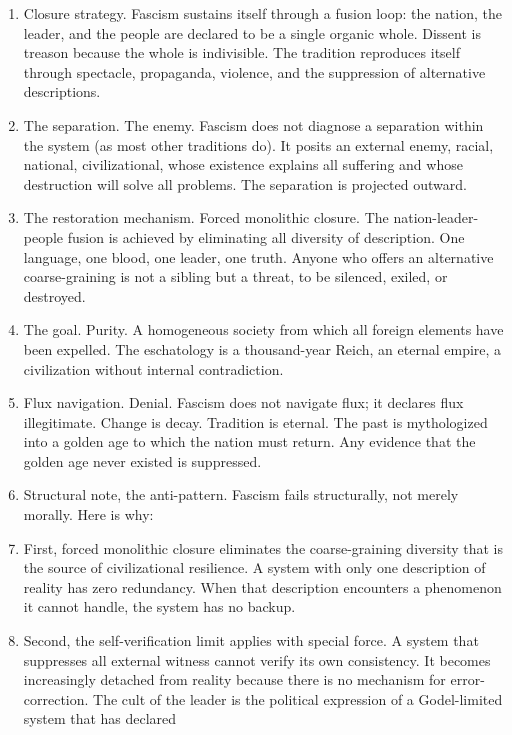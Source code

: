 \documentclass[
]{article}
\begin{document}
\begin{enumerate}
\def\labelenumi{\arabic{enumi}.}
\setcounter{enumi}{94}
\item
  Closure strategy. Fascism sustains itself through a fusion loop: the
  nation, the leader, and the people are declared to be a single organic
  whole. Dissent is treason because the whole is indivisible. The
  tradition reproduces itself through spectacle, propaganda, violence,
  and the suppression of alternative descriptions.
\item
  The separation. The enemy. Fascism does not diagnose a separation
  within the system (as most other traditions do). It posits an external
  enemy, racial, national, civilizational, whose existence explains all
  suffering and whose destruction will solve all problems. The
  separation is projected outward.
\item
  The restoration mechanism. Forced monolithic closure. The
  nation-leader-people fusion is achieved by eliminating all diversity
  of description. One language, one blood, one leader, one truth. Anyone
  who offers an alternative coarse-graining is not a sibling but a
  threat, to be silenced, exiled, or destroyed.
\item
  The goal. Purity. A homogeneous society from which all foreign
  elements have been expelled. The eschatology is a thousand-year Reich,
  an eternal empire, a civilization without internal contradiction.
\item
  Flux navigation. Denial. Fascism does not navigate flux; it declares
  flux illegitimate. Change is decay. Tradition is eternal. The past is
  mythologized into a golden age to which the nation must return. Any
  evidence that the golden age never existed is suppressed.
\item
  Structural note, the anti-pattern. Fascism fails structurally, not
  merely morally. Here is why:
\item
  First, forced monolithic closure eliminates the coarse-graining
  diversity that is the source of civilizational resilience. A system
  with only one description of reality has zero redundancy. When that
  description encounters a phenomenon it cannot handle, the system has
  no backup.
\item
  Second, the self-verification limit applies with special force. A
  system that suppresses all external witness cannot verify its own
  consistency. It becomes increasingly detached from reality because
  there is no mechanism for error-correction. The cult of the leader is
  the political expression of a Godel-limited system that has declared

\end{enumerate}
\end{document}
